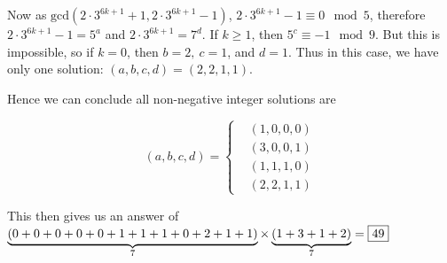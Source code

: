 \begin{solution}
    Now as \(\mathrm{gcd}(2\cdot3^{6k+1}+1,2\cdot3^{6k+1}-1)\), \(2\cdot3^{6k+1}-1\equiv0\mod{5}\), therefore \(2\cdot3^{6k+1}-1=5^a\) and \(2\cdot3^{6k+1}=7^d\). 
    If \(k\geq1\), then \(5^c\equiv-1\mod{9}\). 
    But this is impossible, so if \(k=0\), then \(b=2,\ c=1\), and \(d=1\).  
    Thus in this case, we have only one solution: \((a,b,c,d)=(2,2,1,1)\).

    Hence we can conclude all non-negative integer solutions are

    \begin{equation*}
        (a,b,c,d)=
        \begin{cases}
            &(1,0,0,0)\\
            &(3,0,0,1)\\
            &(1,1,1,0)\\
            &(2,2,1,1)
        \end{cases}
     \end{equation*}
    
    This then gives us an answer of \(\underbrace{(0+0+0+0+0+1+1+1+0+2+1+1)}_{7}\times\underbrace{(1+3+1+2)}_{7}=\fbox{49}\) 
 
\end{solution}\bigskip 